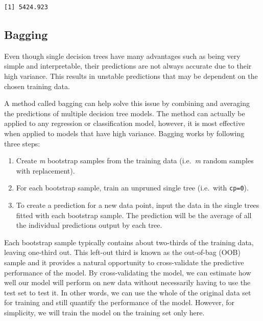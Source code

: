 \documentclass[
  letterpaper,
  DIV=11,
  numbers=noendperiod]{scrreprt}
\newenvironment{Shaded}{\begin{snugshade}}{\end{snugshade}}
\newcommand{\FunctionTok}[1]{\textcolor[rgb]{0.28,0.35,0.67}{#1}}
\newcommand{\NormalTok}[1]{\textcolor[rgb]{0.00,0.23,0.31}{#1}}
\newcommand{\SpecialCharTok}[1]{\textcolor[rgb]{0.37,0.37,0.37}{#1}}
\begin{document}
\begin{Shaded}
\end{Shaded}

\begin{verbatim}
[1] 5424.923
\end{verbatim}

\hypertarget{bagging}{%
\subsection{Bagging}\label{bagging}}

Even though single decision trees have many advantages such as being
very simple and interpretable, their predictions are not always accurate
due to their high variance. This results in unstable predictions that
may be dependent on the chosen training data.

A method called bagging can help solve this issue by combining and
averaging the predictions of multiple decision tree models. The method
can actually be applied to any regression or classification model,
however, it is most effective when applied to models that have high
variance. Bagging works by following three steps:

\begin{enumerate}
\def\labelenumi{\arabic{enumi}.}
\item
  Create \emph{m} bootstrap samples from the training data
  (i.e.~\emph{m} random samples with replacement).
\item
  For each bootstrap sample, train an unpruned single tree (i.e.~with
  \texttt{cp=0}).
\item
  To create a prediction for a new data point, input the data in the
  single trees fitted with each bootstrap sample. The prediction will be
  the average of all the individual predictions output by each tree.
\end{enumerate}

Each bootstrap sample typically contains about two-thirds of the
training data, leaving one-third out. This left-out third is known as
the out-of-bag (OOB) sample and it provides a natural opportunity to
cross-validate the predictive performance of the model. By
cross-validating the model, we can estimate how well our model will
perform on new data without necessarily having to use the test set to
test it. In other words, we can use the whole of the original data set
for training and still quantify the performance of the model. However,
for simplicity, we will train the model on the training set only here.
\end{document}

